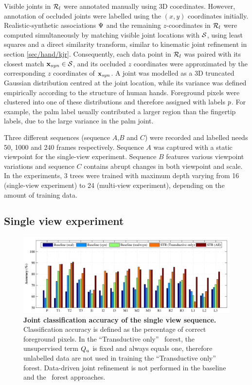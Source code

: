 Visible joints in $\mathcal{R}_{l}$ were annotated manually using 3D coordinates. However, annotation of occluded joints were labelled using the $(x,y)$ coordinates initially.  
Realistic-synthetic associations $\mathrm{\Psi}$ and the remaining $z$-coordinates in $\mathcal{R}_{l}$ were computed simultaneously by matching visible joint locations with $\mathcal{S}$, using least squares and a direct similarity transform, similar to kinematic joint refinement in section \ref{sec/hand/kjr}. 
Consequently, each data point in $\mathcal{R}_{l}$ was paired with its closest match $\mathbf{x}_{syn} \in \mathcal{S}$, and its occluded $z$ coordinates were approximated by the corresponding $z$ coordinates of $\mathbf{x}_{syn}$.  
A joint was modelled as a 3D truncated Gaussian distribution centred at the joint location, while its variance was defined empirically according to the structure of human hands. Foreground pixels were clustered into one of these distributions and therefore assigned with labels $p$. For example, the palm label usually contributed a larger region than the fingertip labels, due to the large variance in the palm joint.

Three different sequences (sequence $A$,$B$ and $C$) were recorded and labelled needs 50, 1000 and 240 frames respectively.  Sequence $A$ was captured with a static viewpoint for the single-view experiment. Sequence $B$ features various viewpoint variations and sequence $C$ contains abrupt changes in both viewpoint and scale. In the experiments, 3 trees were trained with maximum depth varying from 16 (single-view experiment) to 24 (multi-view experiment), depending on the amount of training data.

\subsection{Single view experiment} 

\begin{figure}[ht]
	\centering
	\includegraphics[width=1\linewidth]{fig/hand/singleview.pdf}
	\caption{\textbf{Joint classification accuracy of the single view sequence.} Classification accuracy is defined as the percentage of correct foreground pixels. 
	In the ``Transductive only'' \STR\ forest, the unsupervised term $Q_{u}$ is fixed and always equals one,  therefore unlabelled data are not used in training the ``Transductive only'' forest. 
	Data-driven joint refinement is not performed in the baseline and the \STR\ forest approaches.}
	\label{fig/hand/single}
\end{figure}

